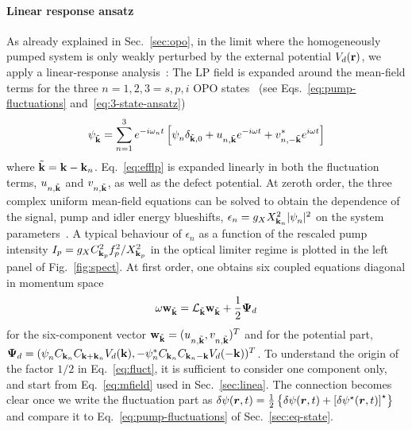 \paragraph{Linear response ansatz}
As already explained in Sec.~\ref{sec:opo}, in the limit where the
homogeneously pumped system is only weakly perturbed by the external
potential $V_d(\mathbf{r})$, we apply a linear-response
analysis~\cite{Astrakharchik_2004}: The LP field is expanded around
the mean-field terms for the three $n=1,2,3=s,p,i$ OPO
states~\cite{Whittaker_2005} (see Eqs.~\eqref{eq:pump-fluctuations}
and~\eqref{eq:3-state-ansatz})
%
\begin{equation}
  \psi_{\tilde{\mathbf{k}}}^{} = \sum_{n=1}^3 e^{-i \omega_n t}
  \left[\psi_{n}^{} \delta_{\tilde{\mathbf{k}},0} +
    u_{n,\tilde{\mathbf{k}}}^{} e^{-i\omega t} +
    v^*_{n,-\tilde{\mathbf{k}}} e^{i\omega t} \right]
\label{eq:expan}
\end{equation}
%
where $\tilde{\mathbf{k}} = \mathbf{k} - \mathbf{k}_n$. Eq.~\eqref{eq:efflp} is
expanded linearly in both the fluctuation terms,
$u_{n,\tilde{\mathbf{k}}}^{}$ and $v_{n,\tilde{\mathbf{k}}}^{}$, as well as
the defect potential.  At zeroth order, the three complex uniform
mean-field equations can be solved to obtain the dependence of the
signal, pump and idler energy blueshifts,
$\epsilon_n = g_X X^2_{\mathbf{k}_n} |\psi_{n}^{}|^2$ on the system
parameters~\cite{Wouters_2007_b}. A typical behaviour of $\epsilon_n$
as a function of the rescaled pump intensity
$I_p = g_X C_{\mathbf{k}_p}^2 f_p^2/X_{\mathbf{k}_p}^2$ in the optical limiter
regime is plotted in the left panel of Fig.~\ref{fig:spect}.
%
At first order, one obtains six coupled equations diagonal in momentum
space~\cite{Wouters_2007}
%
\begin{equation}
  \omega \mathbf{w}_{\tilde{\mathbf{k}}} = \mathcal{L}_{\tilde{\mathbf{k}}}
  \mathbf{w}_{\tilde{\mathbf{k}}} + \frac{1}{2} \bm{\Psi}_d
\label{eq:fluct}
\end{equation}
%
for the six-component vector
$\mathbf{w}_{\tilde{\mathbf{k}}} = (u_{n,\tilde{\mathbf{k}}}^{} ,
v_{n,\tilde{\mathbf{k}}}^{})^{T}$ and for the potential part,
$\bm{\Psi}_d = (\psi_n^{} C_{\mathbf{k}_n} C_{\mathbf{k} + \mathbf{k}_n}
V_d(\mathbf{k}),-\psi_n^* C_{\mathbf{k}_n} C_{\mathbf{k}_n - \mathbf{k}}
V_d(-\mathbf{k}))^{T}$. To understand the origin of the factor $1/2$ in
Eq.~\eqref{eq:fluct}, it is sufficient to consider one component only,
and start from Eq.~\eqref{eq:mfield} used in Sec.~\ref{sec:linea}. The
connection becomes clear once we write the fluctuation part as
$\delta\psi(\bm{r},t) = \frac{1}{2}\left\{\delta\psi(\bm{r},t)
  +\left[\delta\psi^{\star}(\bm{r},t)\right]^{\star}\right\}$ and compare
it to Eq.~\eqref{eq:pump-fluctuations} of Sec.~\ref{sec:eq-state}.



